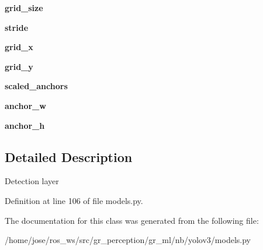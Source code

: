 \begin{DoxyCompactItemize}
{\bfseries grid\+\_\+size}
\item 
\mbox{\label{classmodels_1_1YOLOLayer_a3a4be83473f450023acd7b21f7f96c77}} 
{\bfseries stride}
\item 
\mbox{\label{classmodels_1_1YOLOLayer_a692afdeee8119083c44263660b29d9fc}} 
{\bfseries grid\+\_\+x}
\item 
\mbox{\label{classmodels_1_1YOLOLayer_af87d41a5a18fa42dde4e8f575868cb32}} 
{\bfseries grid\+\_\+y}
\item 
\mbox{\label{classmodels_1_1YOLOLayer_afcff365945aa8531c1187130277e5556}} 
{\bfseries scaled\+\_\+anchors}
\item 
\mbox{\label{classmodels_1_1YOLOLayer_ab07e3103874ba719a899d77528ec2021}} 
{\bfseries anchor\+\_\+w}
\item 
\mbox{\label{classmodels_1_1YOLOLayer_a3c96b7f66b589a616161599c8734896d}} 
{\bfseries anchor\+\_\+h}
\end{DoxyCompactItemize}


\subsection{Detailed Description}
\begin{DoxyVerb}Detection layer\end{DoxyVerb}
 

Definition at line 106 of file models.\+py.



The documentation for this class was generated from the following file\+:\begin{DoxyCompactItemize}
\item 
/home/jose/ros\+\_\+ws/src/gr\+\_\+perception/gr\+\_\+ml/nb/yolov3/models.\+py\end{DoxyCompactItemize}
